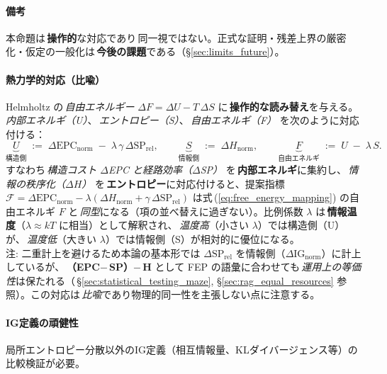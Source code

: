 \documentclass[ja=standard,xelatex]{bxjsarticle}
\newcommand{\F}{\mathcal{F}}
\newcommand{\ignorm}{\Delta\mathrm{IG}_{\mathrm{norm}}}
\begin{document}
\paragraph{備考}\; 本命題は\,\textbf{操作的}な対応であり\,同一視ではない。正式な証明・残差上界の厳密化・仮定の一般化は\,\textbf{今後の課題}である（§\ref{sec:limits_future}）。

\paragraph{熱力学的対応（比喩）}\label{sec:fep_vocab_mapping}
Helmholtz の\,\emph{自由エネルギー} $\Delta F = \Delta U - T\,\Delta S$ に\,\textbf{操作的な読み替え}を与える。\,\emph{内部エネルギ（U）}、\,\emph{エントロピー（S）}、\,\emph{自由エネルギ（F）} を次のように対応付ける：
\begin{equation}
  \underbrace{U}_{\text{構造側}}\;:=\;\Delta\mathrm{EPC}_{\mathrm{norm}}\; -\;\lambda\,\gamma\,\Delta\mathrm{SP}_{\mathrm{rel}},\qquad
  \underbrace{S}_{\text{情報側}}\;:=\;\Delta H_{\mathrm{norm}},\qquad
  \underbrace{F}_{\text{自由エネルギ}}\;:=\;U\; -\;\lambda\,S.
  \label{eq:free_energy_mapping}
\end{equation}
すなわち\,\emph{構造コスト $\Delta$EPC と経路効率（$\Delta$SP）} を\,\textbf{内部エネルギ}に集約し、\,\emph{情報の秩序化（$\Delta H$）} を\,\textbf{エントロピー}に対応付けると、提案指標 $\F=\Delta\mathrm{EPC}_{\mathrm{norm}}-\lambda(\Delta H_{\mathrm{norm}}+\gamma\,\Delta\mathrm{SP}_{\mathrm{rel}})$ は式\,(\ref{eq:free_energy_mapping}) の自由エネルギ $F$ と\,\emph{同型}になる（項の並べ替えに過ぎない）。比例係数 $\lambda$ は\,\textbf{情報温度}（$\lambda\approx kT$ に相当）として解釈され、\,\emph{温度高}（小さい $\lambda$）では構造側（U）が、\,\emph{温度低}（大きい $\lambda$）では情報側（S）が相対的に優位になる。\\
\noindent 注: 二重計上を避けるため本論の基本形では $\Delta\mathrm{SP}_{\mathrm{rel}}$ を情報側（$\ignorm$）に計上しているが、\,\textbf{（EPC$-\,$SP）$-\,$H} として FEP の語彙に合わせても\,\emph{運用上の等価性}は保たれる（\,\S\ref{sec:statistical_testing_maze}, \S\ref{sec:rag_equal_resources} 参照）。この対応は\,\emph{比喩}であり物理的同一性を主張しない点に注意する。

\paragraph{IG定義の頑健性}
局所エントロピー分散以外のIG定義（相互情報量、KLダイバージェンス等）の比較検証が必要。
\end{document}
